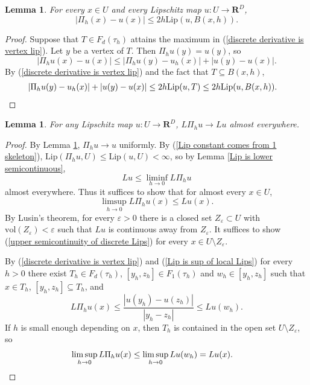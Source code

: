 \documentclass[reqno,11pt]{amsart}
\newcommand{\RR}{\mathbf{R}}
\newcommand{\vol}{\mathrm{vol}}
\newcommand{\Lip}{\mathrm{Lip}}
\newtheorem{lemma}[theorem]{Lemma}
\theoremstyle{definition}
\numberwithin{equation}{section}
\begin{document}
\begin{lemma}\label{uniform convergence}
For every $x \in U$ and every Lipschitz map $u: U \to \RR^D$,
$$|\Pi_h(x) - u(x)| \leq 2h \Lip(u, B(x, h)).$$
\end{lemma}
\begin{proof}
Suppose that $T \in F_d(\tau_h)$ attains the maximum in (\ref{discrete derivative is vertex lip}).
Let $y$ be a vertex of $T$.
Then $\Pi_h u(y) = u(y)$, so 
$$|\Pi_h u(x) - u(x)| \leq |\Pi_h u(y) - u_h(x)| + |u(y) - u(x)|.$$
By (\ref{discrete derivative is vertex lip}) and the fact that $T \subseteq B(x, h)$,
\begin{align*}
|\Pi_h u(y) - u_h(x)| + |u(y) - u(x)| &\leq 2h \Lip(u, T) \leq 2h \Lip(u, B(x, h)). \qedhere
\end{align*}
\end{proof}

\begin{lemma}\label{du converges ae}
For any Lipschitz map $u: U \to \RR^D$, $L\Pi_h u \to Lu$ almost everywhere.
\end{lemma}
\begin{proof}
By Lemma \ref{uniform convergence}, $\Pi_h u \to u$ uniformly.
By (\ref{Lip constant comes from 1 skeleton}), $\Lip(\Pi_h u, U) \leq \Lip(u, U) < \infty$, so by Lemma \ref{Lip is lower semicontinuous},
$$Lu \leq \liminf_{h \to 0} L\Pi_hu$$
almost everywhere.
Thus it suffices to show that for almost every $x \in U$,
\begin{equation}\label{upper semicontinuity of discrete Lips}
\limsup_{h \to 0} L\Pi_h u(x) \leq Lu(x).
\end{equation}
By Lusin's theorem, for every $\varepsilon > 0$ there is a closed set $Z_\varepsilon \subset U$ with $\vol(Z_\varepsilon) < \varepsilon$ such that $Lu$ is continuous away from $Z_\varepsilon$.
It suffices to show (\ref{upper semicontinuity of discrete Lips}) for every $x \in U \setminus Z_\varepsilon$.

By (\ref{discrete derivative is vertex lip}) and (\ref{Lip is sup of local Lips}) for every $h > 0$ there exist $T_h \in F_d(\tau_h)$, $[y_h, z_h] \in F_1(\tau_h)$ and $w_h \in [y_h, z_h]$ such that $x \in T_h$, $[y_h, z_h] \subseteq T_h$, and
$$L \Pi_h u(x) \leq \frac{|u(y_h) - u(z_h)|}{|y_h - z_h|} \leq Lu(w_h).$$
If $h$ is small enough depending on $x$, then $T_h$ is contained in the open set $U \setminus Z_\varepsilon$, so 
\begin{align*}
\limsup_{h \to 0} L \Pi_h u(x) \leq \limsup_{h \to 0} Lu(w_h) &= Lu(x). \qedhere
\end{align*}
\end{proof}
\end{document}
